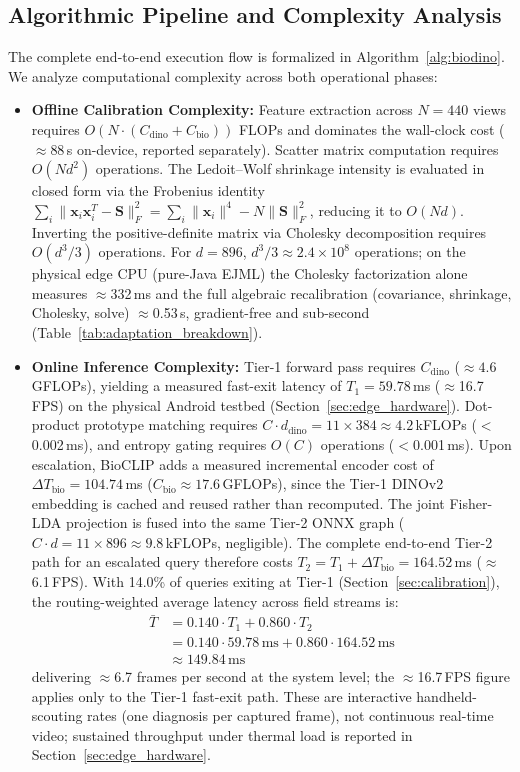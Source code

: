 \documentclass[preprint,12pt]{elsarticle}
\begin{document}
\subsection{Algorithmic Pipeline and Complexity Analysis}
\label{sec:complexity}
The complete end-to-end execution flow is formalized in Algorithm~\ref{alg:biodino}. We analyze computational complexity across both operational phases:
\begin{itemize}
    \item \textbf{Offline Calibration Complexity:} Feature extraction across $N=440$ views requires $O(N \cdot (C_{\text{dino}} + C_{\text{bio}}))$ FLOPs and dominates the wall-clock cost ($\approx$88\,s on-device, reported separately). Scatter matrix computation requires $O(N d^2)$ operations. The Ledoit--Wolf shrinkage intensity is evaluated in closed form via the Frobenius identity $\sum_i \|\mathbf{x}_i \mathbf{x}_i^T - \mathbf{S}\|_F^2 = \sum_i \|\mathbf{x}_i\|^4 - N \|\mathbf{S}\|_F^2$, reducing it to $O(N d)$. Inverting the positive-definite matrix via Cholesky decomposition requires $O(d^3 / 3)$ operations. For $d=896$, $d^3 / 3 \approx 2.4 \times 10^8$ operations; on the physical edge CPU (pure-Java EJML) the Cholesky factorization alone measures $\approx$332\,ms and the full algebraic recalibration (covariance, shrinkage, Cholesky, solve) $\approx$0.53\,s, gradient-free and sub-second (Table~\ref{tab:adaptation_breakdown}).
    \item \textbf{Online Inference Complexity:} Tier-1 forward pass requires $C_{\text{dino}}$ ($\approx 4.6$\,GFLOPs), yielding a measured fast-exit latency of $T_1 = 59.78$\,ms ($\approx$16.7\,FPS) on the physical Android testbed (Section~\ref{sec:edge_hardware}). Dot-product prototype matching requires $C \cdot d_{\text{dino}} = 11 \times 384 \approx 4.2$\,kFLOPs ($<$0.002\,ms), and entropy gating requires $O(C)$ operations ($<$0.001\,ms). Upon escalation, BioCLIP adds a measured incremental encoder cost of $\Delta T_{\text{bio}} = 104.74$\,ms ($C_{\text{bio}} \approx 17.6$\,GFLOPs), since the Tier-1 DINOv2 embedding is cached and reused rather than recomputed. The joint Fisher-LDA projection is fused into the same Tier-2 ONNX graph ($C \cdot d = 11 \times 896 \approx 9.8$\,kFLOPs, negligible). The complete end-to-end Tier-2 path for an escalated query therefore costs $T_2 = T_1 + \Delta T_{\text{bio}} = 164.52$\,ms ($\approx$6.1\,FPS). With 14.0\% of queries exiting at Tier-1 (Section~\ref{sec:calibration}), the routing-weighted average latency across field streams is:
    \begin{align}
        \bar{T} &= 0.140 \cdot T_1 + 0.860 \cdot T_2 \nonumber \\
        &= 0.140 \cdot 59.78\,\text{ms} + 0.860 \cdot 164.52\,\text{ms} \nonumber \\
        &\approx 149.84\,\text{ms}
    \end{align}
    delivering $\approx$6.7 frames per second at the system level; the $\approx$16.7\,FPS figure applies only to the Tier-1 fast-exit path. These are interactive handheld-scouting rates (one diagnosis per captured frame), not continuous real-time video; sustained throughput under thermal load is reported in Section~\ref{sec:edge_hardware}.
\end{itemize}
\end{document}
